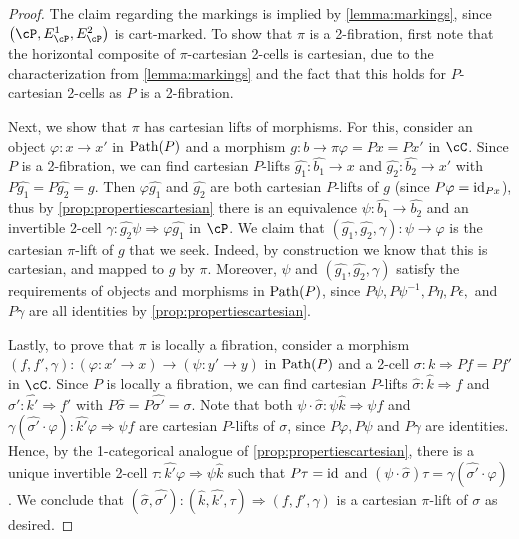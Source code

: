\documentclass[11pt, dvipsnames]{amsart}
\begin{document}
\begin{proof}
    The claim regarding the markings is implied by \cref{lemma:markings}, since $\markedscat{\cP}$ is cart-marked. To show that $\pi$ is a 2-fibration, first note that the horizontal composite of $\pi$-cartesian 2-cells is cartesian, due to the characterization from \cref{lemma:markings} and the fact that this holds for $P$-cartesian 2-cells as $P$ is a 2-fibration.  
    
    Next, we show that $\pi$ has cartesian lifts of morphisms. For this, consider an object $\varphi \colon x\to x'$ in $\mathrm{Path}(P)$ and a morphism $g\colon b\to \pi \varphi=Px=Px'$ in $\cC$.	Since $P$ is a 2-fibration, we can find cartesian $P$-lifts $\widehat{g_1}\colon\widehat{b_1}\to x$ and $\widehat{g_2}\colon\widehat{b_2}\to x'$ with $P\widehat{g_1}=P\widehat{g_2}=g$. Then $\varphi\widehat{g_1}$ and $\widehat{g_2}$ are both cartesian $P$-lifts of $g$ (since $P\varphi=\mathrm{id}_{Px}$), thus by \cref{prop:propertiescartesian} there is an equivalence $\psi\colon \widehat{b_1}\to \widehat{b_2}$ and an invertible 2-cell $\gamma \colon\widehat{g_2} \psi\Rightarrow \varphi\widehat{g_1}$ in $\cP$. We claim that $(\widehat{g_1},\widehat{g_2},\gamma)\colon \psi \to \varphi$ is the cartesian $\pi$-lift of $g$ that we seek. Indeed, by construction we know that this is cartesian, and mapped to $g$ by $\pi$. Moreover, $\psi$ and $(\widehat{g_1},\widehat{g_2},\gamma)$ satisfy the requirements of objects and morphisms in $\mathrm{Path}(P)$, since $P\psi,P\psi^{-1},P\eta,P\epsilon,$ and $P\gamma$ are all identities by \cref{prop:propertiescartesian}. 

    Lastly, to prove that $\pi$ is locally a fibration, consider a morphism $(f,f',\gamma)\colon (\varphi\colon x'\to x)\to (\psi\colon y'\to y)$ in $\mathrm{Path}(P)$ and a 2-cell $\sigma\colon k\Rightarrow Pf=Pf'$ in $\cC$. Since $P$ is locally a fibration, we can find cartesian $P$-lifts $\widehat\sigma\colon\widehat k\Rightarrow f$ and $\widehat\sigma'\colon\widehat{k'}\Rightarrow f'$ with $P\widehat{\sigma}=P\widehat{\sigma'}=\sigma$. Note that both $\psi\cdot\widehat{\sigma}\colon \psi\widehat{k}\Rightarrow \psi f$ and $\gamma(\widehat{\sigma'}\cdot \varphi)\colon \widehat{k'}\varphi\Rightarrow \psi f$ are  cartesian $P$-lifts of $\sigma$, since $P\varphi, P\psi$ and $P\gamma$ are identities. Hence, by the 1-categorical analogue of \cref{prop:propertiescartesian}, there is a unique invertible 2-cell $\tau\colon\widehat{k'}\varphi \Rightarrow \psi\widehat k$ such that $P\tau=\mathrm{id}$ and $(\psi\cdot\widehat{\sigma})\tau = \gamma(\widehat{\sigma'}\cdot \varphi)$.
	We conclude that $(\widehat{\sigma},\widehat{\sigma'})\colon(\widehat{k},\widehat{k'},\tau)\Rightarrow (f,f',\gamma)$ is a cartesian $\pi$-lift of $\sigma$ as desired.
\end{proof}
\end{document}
